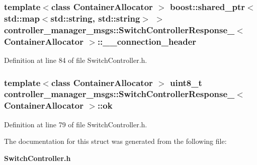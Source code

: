\subsubsection[{\-\_\-\-\_\-connection\-\_\-header}]{\setlength{\rightskip}{0pt plus 5cm}template$<$class Container\-Allocator $>$ boost\-::shared\-\_\-ptr$<$std\-::map$<$std\-::string, std\-::string$>$ $>$ {\bf controller\-\_\-manager\-\_\-msgs\-::\-Switch\-Controller\-Response\-\_\-}$<$ \-Container\-Allocator $>$\-::{\bf \-\_\-\-\_\-connection\-\_\-header}}\label{structcontroller__manager__msgs_1_1SwitchControllerResponse___aa503b553d17fa3a221d0b0197b292af3}


\-Definition at line 84 of file \-Switch\-Controller.\-h.

\subsubsection[{ok}]{\setlength{\rightskip}{0pt plus 5cm}template$<$class Container\-Allocator $>$ uint8\-\_\-t {\bf controller\-\_\-manager\-\_\-msgs\-::\-Switch\-Controller\-Response\-\_\-}$<$ \-Container\-Allocator $>$\-::{\bf ok}}\label{structcontroller__manager__msgs_1_1SwitchControllerResponse___a88a06ee8c20e6ce3201f71ae23b820c9}


\-Definition at line 79 of file \-Switch\-Controller.\-h.



\-The documentation for this struct was generated from the following file\-:\begin{DoxyCompactItemize}
\item 
{\bf \-Switch\-Controller.\-h}\end{DoxyCompactItemize}
